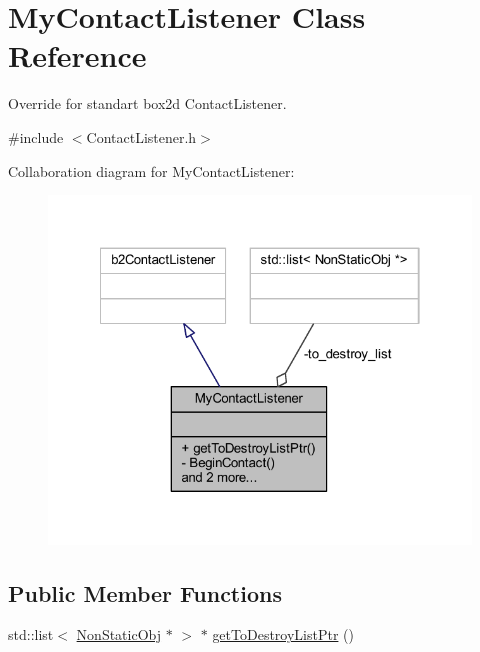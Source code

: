 \hypertarget{class_my_contact_listener}{}\section{My\+Contact\+Listener Class Reference}
\label{class_my_contact_listener}


Override for standart box2d Contact\+Listener.  




{\ttfamily \#include $<$Contact\+Listener.\+h$>$}



Collaboration diagram for My\+Contact\+Listener\+:
\nopagebreak
\begin{figure}[H]
\begin{center}
\leavevmode
\includegraphics[width=322pt]{class_my_contact_listener__coll__graph}
\end{center}
\end{figure}
\subsection*{Public Member Functions}
\begin{DoxyCompactItemize}
\item 
std\+::list$<$ \hyperlink{class_non_static_obj}{Non\+Static\+Obj} $\ast$ $>$ $\ast$ \hyperlink{class_my_contact_listener_a3e414c674f98a2f35e2c894923d045b2}{get\+To\+Destroy\+List\+Ptr} ()
\end{DoxyCompactItemize}
